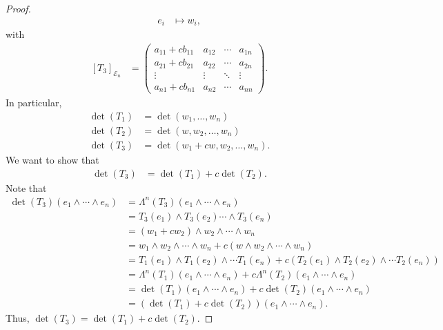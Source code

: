\documentclass[10pt]{mypackage}
\begin{document}
\begin{proof}
\begin{align*}
        e_{i} &\mapsto w_i,
      \end{align*}
      with
      \begin{align*}
        \left[T_3\right]_{\mathcal{E}_n} &= \begin{pmatrix}a_{11} + cb_{11} & a_{12} & \cdots & a_{1n} \\ a_{21} + cb_{21} & a_{22} & \cdots & a_{2n} \\ \vdots & \vdots & \ddots &\vdots \\ a_{n1} + cb_{n1} & a_{n2} & \cdots & a_{nn}\end{pmatrix}.
      \end{align*}
      In particular,
      \begin{align*}
        \det\left(T_1\right) &= \det\left(w_1,\dots,w_n\right)\\
        \det\left(T_2\right) &= \det\left(w,w_2,\dots,w_n\right)\\
        \det\left(T_3\right) &= \det\left(w_1 + cw,w_2,\dots,w_n\right).
      \end{align*}
      We want to show that
      \begin{align*}
        \det\left(T_3\right) &= \det\left(T_1\right) + c\det\left(T_2\right).
      \end{align*}
      Note that
      \begin{align*}
        \det\left(T_3\right)\left(e_1\wedge\cdots\wedge e_n\right) &= \Lambda^{n}\left(T_3\right)\left(e_1\wedge\cdots\wedge e_n\right)\\
                                                                   &= T_3\left(e_1\right)\wedge T_3\left(e_2\right)\cdots\wedge T_{3}\left(e_n\right)\\
                                                                   &= \left(w_1 + cw_2\right)\wedge w_2\wedge \cdots \wedge w_n\\
                                                                   &= w_1\wedge w_2\wedge\cdots\wedge w_n + c\left(w\wedge w_2 \wedge \cdots \wedge w_n\right)\\
                                                                   &= T_1\left(e_1\right)\wedge T_1\left(e_2\right)\wedge\cdots T_1\left(e_n\right) + c\left(T_2\left(e_1\right)\wedge T_2\left(e_2\right)\wedge\cdots T_2\left(e_n\right)\right)\\
                                                                   &= \Lambda^{n}\left(T_1\right)\left(e_1\wedge\cdots\wedge e_n\right) + c\Lambda^{n}\left(T_2\right)\left(e_1\wedge\cdots\wedge e_n\right)\\
                                                                  &= \det\left(T_1\right)\left(e_1\wedge\cdots\wedge e_n\right) + c\det\left(T_2\right)\left(e_1\wedge\cdots\wedge e_n\right)\\
                                                                  &= \left(\det\left(T_1\right) + c\det\left(T_2\right)\right)\left(e_1\wedge\cdots\wedge e_n\right).
      \end{align*}
      Thus, $\det\left(T_3\right) = \det\left(T_1\right) + c\det\left(T_2\right)$.\newline


\end{proof}
\end{document}
